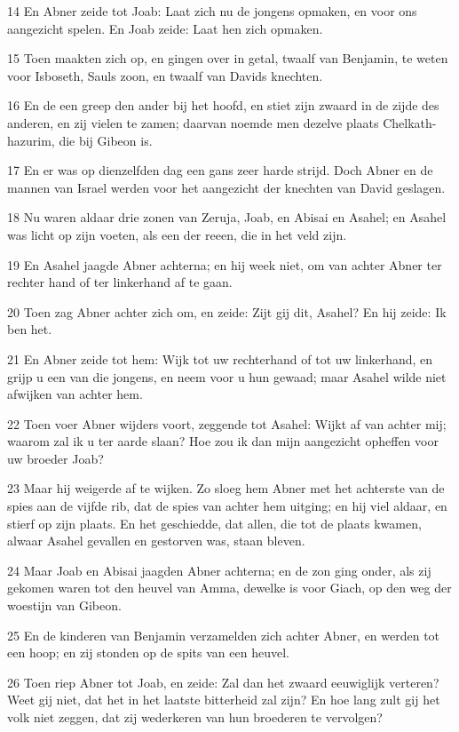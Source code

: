 \par 14 En Abner zeide tot Joab: Laat zich nu de jongens opmaken, en voor ons aangezicht spelen. En Joab zeide: Laat hen zich opmaken.
\par 15 Toen maakten zich op, en gingen over in getal, twaalf van Benjamin, te weten voor Isboseth, Sauls zoon, en twaalf van Davids knechten.
\par 16 En de een greep den ander bij het hoofd, en stiet zijn zwaard in de zijde des anderen, en zij vielen te zamen; daarvan noemde men dezelve plaats Chelkath-hazurim, die bij Gibeon is.
\par 17 En er was op dienzelfden dag een gans zeer harde strijd. Doch Abner en de mannen van Israel werden voor het aangezicht der knechten van David geslagen.
\par 18 Nu waren aldaar drie zonen van Zeruja, Joab, en Abisai en Asahel; en Asahel was licht op zijn voeten, als een der reeen, die in het veld zijn.
\par 19 En Asahel jaagde Abner achterna; en hij week niet, om van achter Abner ter rechter hand of ter linkerhand af te gaan.
\par 20 Toen zag Abner achter zich om, en zeide: Zijt gij dit, Asahel? En hij zeide: Ik ben het.
\par 21 En Abner zeide tot hem: Wijk tot uw rechterhand of tot uw linkerhand, en grijp u een van die jongens, en neem voor u hun gewaad; maar Asahel wilde niet afwijken van achter hem.
\par 22 Toen voer Abner wijders voort, zeggende tot Asahel: Wijkt af van achter mij; waarom zal ik u ter aarde slaan? Hoe zou ik dan mijn aangezicht opheffen voor uw broeder Joab?
\par 23 Maar hij weigerde af te wijken. Zo sloeg hem Abner met het achterste van de spies aan de vijfde rib, dat de spies van achter hem uitging; en hij viel aldaar, en stierf op zijn plaats. En het geschiedde, dat allen, die tot de plaats kwamen, alwaar Asahel gevallen en gestorven was, staan bleven.
\par 24 Maar Joab en Abisai jaagden Abner achterna; en de zon ging onder, als zij gekomen waren tot den heuvel van Amma, dewelke is voor Giach, op den weg der woestijn van Gibeon.
\par 25 En de kinderen van Benjamin verzamelden zich achter Abner, en werden tot een hoop; en zij stonden op de spits van een heuvel.
\par 26 Toen riep Abner tot Joab, en zeide: Zal dan het zwaard eeuwiglijk verteren? Weet gij niet, dat het in het laatste bitterheid zal zijn? En hoe lang zult gij het volk niet zeggen, dat zij wederkeren van hun broederen te vervolgen?
